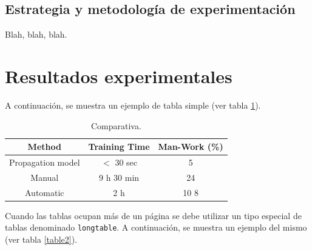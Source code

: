 \documentclass[spanish,openright]{book}
\begin{document}
\subsection{Estrategia y metodología de experimentación}
\label{sec:estr-y-metod}

Blah, blah, blah.


\section{Resultados experimentales}
\label{sec:result-experim}

A continuación, se muestra un ejemplo de tabla simple (ver tabla \ref{table1}).

\begin{table}
\renewcommand{\arraystretch}{1.3}
\caption{Comparativa.}
\label{table1}
\begin{center}
\begin{tabular}{|c|c|c|}
\hline
Method & Training Time & Man-Work (\%)\\
\hline
Propagation model & $<$ 30 sec & 5\\
\hline
Manual & 9 h 30 min & 24\\
\hline
Automatic & 2 h & 10 8\\
\hline
\end{tabular}
\end{center}
\end{table}

Cuando las tablas ocupan más de un página se debe utilizar un tipo
especial de tablas denominado \texttt{longtable}. A continuación, se
muestra un ejemplo del mismo (ver tabla \ref{table2}).
\end{document}
